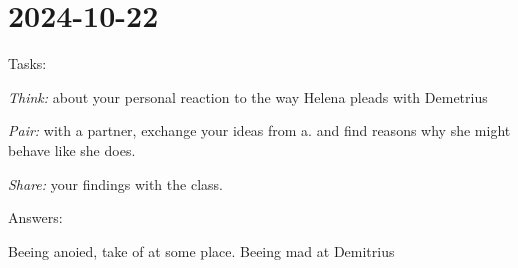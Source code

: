\section{2024-10-22 }

{\bfb Tasks:}
\startitemize[packed,a][indentnext=no]

\item {\em Think: } about your personal reaction to the way Helena pleads with Demetrius
\item {\em Pair: } with a partner, exchange your ideas from a. and find reasons why she might behave like she does.
\item {\em Share: } your findings with the class.

\stopitemize


{\bfb Answers:}
\startitemize[packed,a]
\item Beeing anoied, take of at some place. Beeing mad at Demitrius
\stopitemize
